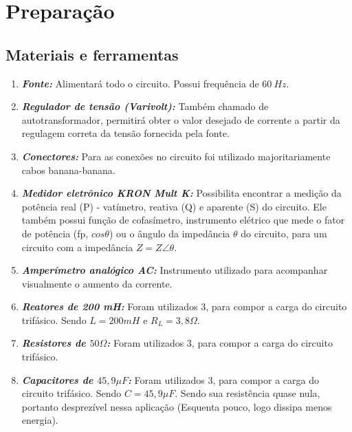 \documentclass[a4paper,12pt,oneside,openany,table,xcdraw]{article}
\begin{document}
\section{Preparação}
\subsection{Materiais e ferramentas} %
\begin{enumerate}[1 -]
\item \emph{\textbf{Fonte:}}
Alimentará todo o circuito. Possui frequência de $60\ Hz$.

\item \emph{\textbf{Regulador de tensão (Varivolt):}}
Também chamado de autotransformador, permitirá obter o valor desejado de corrente a partir da regulagem correta da tensão fornecida pela fonte.

\item \emph{\textbf{Conectores:}}
Para as conexões no circuito foi utilizado majoritariamente cabos banana-banana.

\item \emph{\textbf{Medidor eletrônico KRON Mult K:}}
Possibilita encontrar a medição da potência real (P) - vatímetro, reativa (Q) e aparente (S) do circuito. Ele também possui função de cofasímetro, instrumento elétrico que mede o fator de potência (fp, $cos\theta$) ou o ângulo da impedância $\theta$ do circuito, para um circuito com a impedância $Z = Z\angle \theta$.

\item \emph{\textbf{Amperímetro analógico AC:}}
Instrumento utilizado para acompanhar visualmente o aumento da corrente.

\item \emph{\textbf{Reatores de 200 mH:}}
Foram utilizados 3, para compor a carga do circuito trifásico. Sendo $L=200mH$ e $R_L=3,8\Omega$.

\item \emph{\textbf{Resistores de $50\Omega$:}}
Foram utilizados 3, para compor a carga do circuito trifásico.

\item \emph{\textbf{Capacitores de $45,9\mu F$:}}
Foram utilizados 3, para compor a carga do circuito trifásico. Sendo $C= 45,9\mu F$. Sendo sua resistência quase nula, portanto desprezível nessa aplicação (Esquenta pouco, logo dissipa menos energia).
\end{enumerate}

\vspace{0.2cm}
\end{document}
